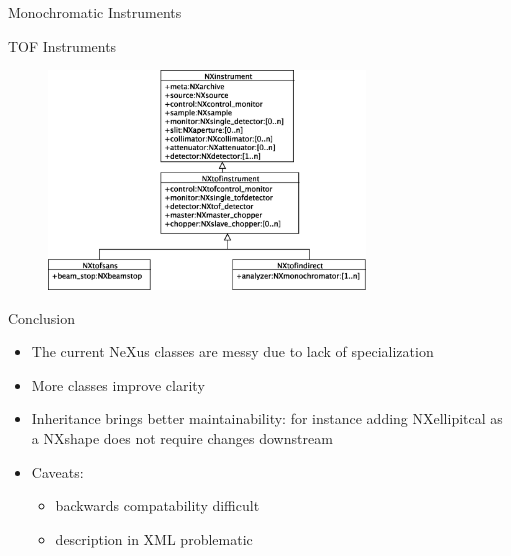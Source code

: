 \documentclass[final,nototal,pdf,mark]{prosper}
\begin{document}
\begin{slide}{Monochromatic Instruments }
\begin{center}
\end{center}

\end{slide}\begin{slide}{TOF Instruments }
\begin{center}
\begin{figure}
\includegraphics[width=0.75\textwidth]{nxtofinst.eps}\end{figure}



\end{center}

\end{slide}\begin{slide}{Conclusion }
\begin{itemize}\item The current NeXus classes are messy due to lack of specialization
\item More classes improve clarity
\item Inheritance brings better maintainability: for instance adding NXellipitcal as 
 a NXshape does not require changes downstream
\item Caveats:
\begin{itemize}\item backwards compatability diff\mbox{}icult
\item description in XML problematic
\end{itemize}\end{itemize}
















\end{slide}
\end{document}
